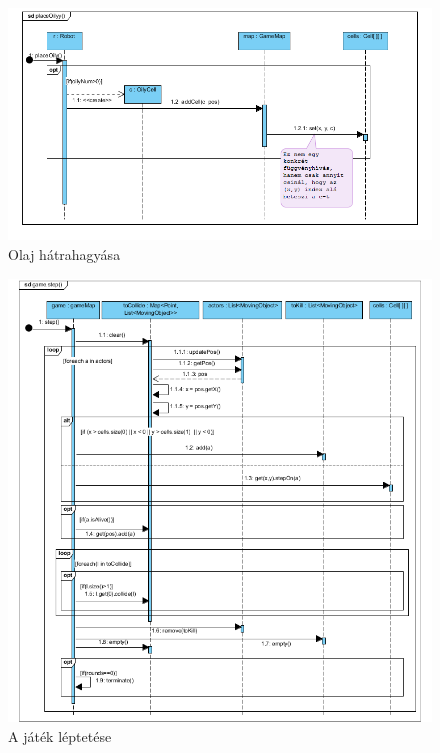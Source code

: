 \begin{figure}[!htbp]
	\begin{center}
		\includegraphics[width=178mm, center]{./chapters/chapter03/oily.png}
		\caption{Olaj hátrahagyása}
	\end{center}
\end{figure}

\begin{figure}[!htbp]
	\begin{center}
		\includegraphics[width=195mm, center]{./chapters/chapter03/step.png}
		\caption{A játék léptetése}
	\end{center}
\end{figure}

\clearpage


